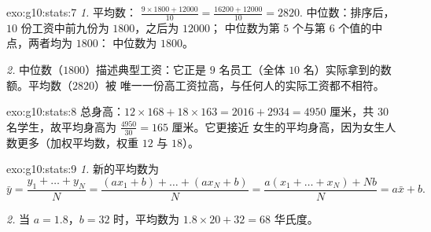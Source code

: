 \begin{solution}{exo:g10:stats:7}
\emph{1.} 平均数：
$\frac{9 \times 1800 + 12000}{10} = \frac{16200 + 12000}{10} = 2820$.
中位数：排序后，$10$ 份工资中前九份为 $1800$，之后为 $12000$；
中位数为第 $5$ 个与第 $6$ 个值的中点，两者均为 $1800$：
中位数为 $1800$。

\emph{2.} 中位数（$1800$）描述典型工资：它正是
$9$ 名员工（全体 $10$ 名）实际拿到的数额。平均数（$2820$）被
唯一一份高工资拉高，与任何人的实际工资都不相符。
\end{solution}

\begin{solution}{exo:g10:stats:8}
总身高：$12 \times 168 + 18 \times 163 = 2016 + 2934 = 4950$ 厘米，共
$30$ 名学生，故平均身高为 $\frac{4950}{30} = 165$ 厘米。它更接近
女生的平均身高，因为女生人数更多（加权平均数，权重
$12$ 与 $18$）。
\end{solution}

\begin{solution}{exo:g10:stats:9}
\emph{1.} 新的平均数为
\[
\bar y = \frac{y_1 + \dots + y_N}{N}
= \frac{(a x_1 + b) + \dots + (a x_N + b)}{N}
= \frac{a(x_1 + \dots + x_N) + Nb}{N}
= a \bar x + b .
\]

\emph{2.} 当 $a = 1.8$，$b = 32$ 时，平均数为
$1.8 \times 20 + 32 = 68$ 华氏度。
\end{solution}

